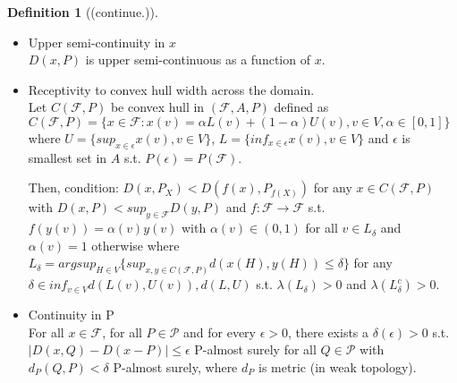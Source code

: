 \documentclass[aspectratio=169,ignorenonframetext,9pt]{beamer}
\theoremstyle{plain}
\theoremstyle{definition}
\newtheorem{defn}{Definition}[section]
\begin{document}
\begin{frame}
    \begin{defn}[(continue.)]
        \begin{itemize}
        \item Upper semi-continuity in $x$ \\
            $D(x,P)$ is upper semi-continuous as a function of $x$.
        \item Receptivity to convex hull width across the domain. \\
            Let $C(\mathcal{F},P)$ be convex hull in $(\mathcal{F},A,P)$ defined as
            \(C(\mathcal{F},P)=\{x\in\mathcal{F} : x(v)=\alpha L(v)+ (1-\alpha)U(v), v\in V, \alpha\in[0,1]\}\)
            where $U=\{sup_{x\in\epsilon}x(v),v\in V\}$, $L=\{inf_{x\in\epsilon}x(v),v\in V\}$
            and $\epsilon$ is smallest set in $A$ s.t. $P(\epsilon)=P(\mathcal{F})$.

            Then, condition: $D(x,P_X)<D(f(x),P_{f(X)})$ for any $x\in C(\mathcal{F},P)$
            with $D(x,P)<sup_{y\in\mathcal{F}}D(y,P)$ and $f:\mathcal{F}\rightarrow\mathcal{F}$
            s.t. $f(y(v))=\alpha(v)y(v)$ with $\alpha(v)\in(0,1)$ for all $v\in L_{\delta}$ and $\alpha(v)=1$  otherwise
            where \(L_\delta = argsup_{H\in V} \{sup_{x,y\in C(\mathcal{F},P)} d(x(H),y(H)) \leq \delta\}\)
            for any $\delta\in inf_{v\in V}d(L(v),U(v)), d(L,U)$ s.t. $\lambda(L_\delta)>0$ and $\lambda(L_\delta^c)>0$.
        \item Continuity in P \\ 
            For all $x\in\mathcal{F}$, for all $P \in \mathcal{P}$ and for every $\epsilon>0$,
            there exists a $\delta(\epsilon)>0$ s.t. $|D(x,Q)-D(x-P)|\leq\epsilon$ P-almost surely for all $Q\in\mathcal{P}$ with
            $d_P(Q,P)<\delta$ P-almost surely, where $d_P$ is metric (in weak topology).
        \end{itemize}
    \end{defn}
\end{frame}
\end{document}
